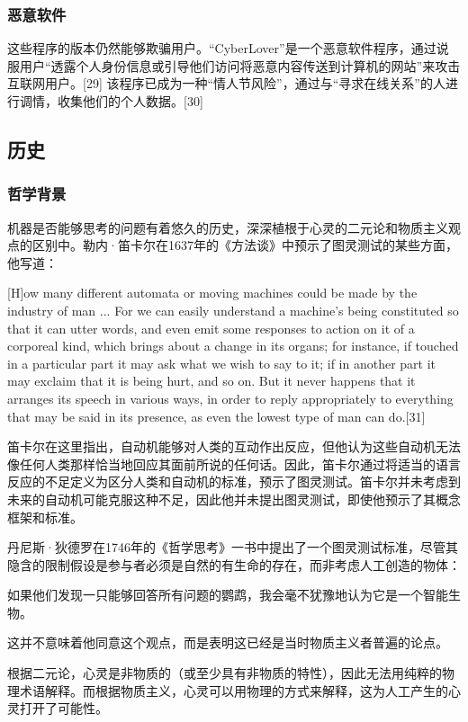 \subsubsection{恶意软件}  
这些程序的版本仍然能够欺骗用户。“CyberLover”是一个恶意软件程序，通过说服用户“透露个人身份信息或引导他们访问将恶意内容传送到计算机的网站”来攻击互联网用户。[29] 该程序已成为一种“情人节风险”，通过与“寻求在线关系”的人进行调情，收集他们的个人数据。[30]
\subsection{历史}  
\subsubsection{哲学背景}
机器是否能够思考的问题有着悠久的历史，深深植根于心灵的二元论和物质主义观点的区别中。勒内·笛卡尔在1637年的《方法谈》中预示了图灵测试的某些方面，他写道：

[H]ow many different automata or moving machines could be made by the industry of man ... For we can easily understand a machine's being constituted so that it can utter words, and even emit some responses to action on it of a corporeal kind, which brings about a change in its organs; for instance, if touched in a particular part it may ask what we wish to say to it; if in another part it may exclaim that it is being hurt, and so on. But it never happens that it arranges its speech in various ways, in order to reply appropriately to everything that may be said in its presence, as even the lowest type of man can do.[31]

笛卡尔在这里指出，自动机能够对人类的互动作出反应，但他认为这些自动机无法像任何人类那样恰当地回应其面前所说的任何话。因此，笛卡尔通过将适当的语言反应的不足定义为区分人类和自动机的标准，预示了图灵测试。笛卡尔并未考虑到未来的自动机可能克服这种不足，因此他并未提出图灵测试，即使他预示了其概念框架和标准。

丹尼斯·狄德罗在1746年的《哲学思考》一书中提出了一个图灵测试标准，尽管其隐含的限制假设是参与者必须是自然的有生命的存在，而非考虑人工创造的物体：

如果他们发现一只能够回答所有问题的鹦鹉，我会毫不犹豫地认为它是一个智能生物。

这并不意味着他同意这个观点，而是表明这已经是当时物质主义者普遍的论点。

根据二元论，心灵是非物质的（或至少具有非物质的特性），因此无法用纯粹的物理术语解释。而根据物质主义，心灵可以用物理的方式来解释，这为人工产生的心灵打开了可能性。

